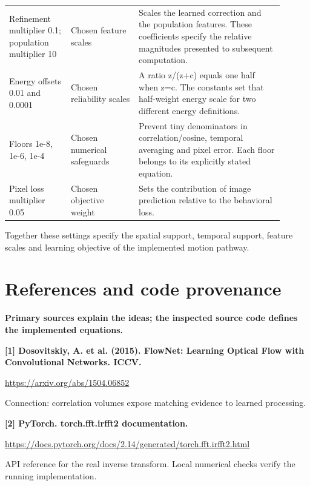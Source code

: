 \documentclass[11pt,letterpaper]{article}
\begin{document}
\begin{center}
\begin{tabular}{p{0.206\linewidth}p{0.224\linewidth}p{0.470\linewidth}}
Refinement multiplier 0.1; population multiplier 10 & Chosen feature scales & Scales the learned correction and the population features. These coefficients specify the relative magnitudes presented to subsequent computation. \\

Energy offsets 0.01 and 0.0001 & Chosen reliability scales & A ratio z/\allowbreak{}(z+c) equals one half when z=c. The constants set that half-weight energy scale for two different energy definitions. \\

Floors 1e-8, 1e-6, 1e-4 & Chosen numerical safeguards & Prevent tiny denominators in correlation/\allowbreak{}cosine, temporal averaging and pixel error. Each floor belongs to its explicitly stated equation. \\

Pixel loss multiplier 0.05 & Chosen objective weight & Sets the contribution of image prediction relative to the behavioral loss. \\

\bottomrule\end{tabular}\end{center}

Together these settings specify the spatial support, temporal support, feature scales and learning objective of the implemented motion pathway.


\clearpage

\section{References and code provenance}\label{sec21}

\textbf{Primary sources explain the ideas; the inspected source code defines the implemented equations.}


\textbf{[1] Dosovitskiy, A. et al. (2015). FlowNet: Learning Optical Flow with Convolutional Networks. ICCV.}


{
\small\color{muted} \href{https://arxiv.org/abs/1504.06852}{https:/\allowbreak{}/\allowbreak{}arxiv.org/\allowbreak{}abs/\allowbreak{}1504.06852}\par Connection: correlation volumes expose matching evidence to learned processing.\par}


\textbf{[2] PyTorch. torch.fft.irfft2 documentation.}


{
\small\color{muted} \href{https://docs.pytorch.org/docs/2.14/generated/torch.fft.irfft2.html}{https:/\allowbreak{}/\allowbreak{}docs.pytorch.org/\allowbreak{}docs/\allowbreak{}2.14/\allowbreak{}generated/\allowbreak{}torch.fft.irfft2.html}\par API reference for the real inverse transform. Local numerical checks verify the running implementation.\par}
\end{document}
